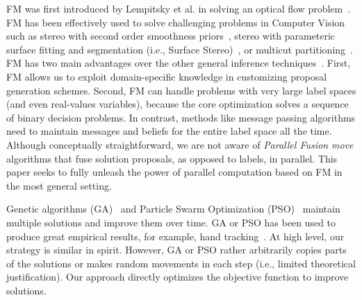 
\noindent FM was first introduced by Lempitsky et al. in solving an
optical flow problem~\cite{fusion_flow}. FM has been effectively used to solve challenging
problems in Computer Vision such as stereo with second order smoothness
priors~\cite{second_order_stereo}, stereo with parameteric surface fitting and
segmentation (i.e., Surface Stereo)~\cite{surface_stereo}, or multicut
partitioning~\cite{fusion_moves_for_correlation_clustering}.
%
FM has two main advantages over the other general inference
techniques~\cite{TRW-S,loopy_belief_propagation}. First, FM allows us to
exploit domain-specific knowledge in customizing proposal generation
schemes. Second, FM can handle problems with very large label spaces
(and even real-values variables), because the core optimization
solves a sequence of binary decision problems.
%
In contrast, methods like message passing algorithms need to maintain
messages and beliefs for the entire label space all the time.
%
Although conceptually straightforward, we are not aware of {\it Parallel
Fusion move} algorithms that fuse solution proposals, as opposed to
labels, in parallel. This paper seeks to fully unleash the power of
parallel computation based on FM in the most general setting.



\noindent
Genetic algorithms (GA)~\cite{ga} and Particle Swarm
Optimization (PSO)~\cite{pso} maintain multiple solutions and improve
them over time.
%
GA or PSO has been used to produce great empirical results, for example,
hand tracking~\cite{pushmeet_hand_tracking}.
%
At high level, our strategy is similar in spirit. However, GA or PSO
rather arbitrarily copies parts of the solutions or makes random movements
in each step (i.e., limited theoretical justification).
%
Our approach directly optimizes the objective function to improve
solutions.


